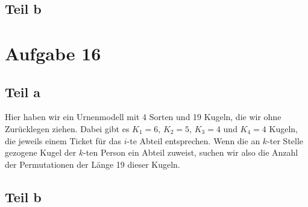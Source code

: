 \documentclass[10pt,a4paper]{article}
\begin{document}
\subsection{Teil b}

\section{Aufgabe 16}

\subsection{Teil a}
Hier haben wir ein Urnenmodell mit 4 Sorten und 19 Kugeln, die wir ohne Zurücklegen ziehen.
Dabei gibt es $K_{1} = 6$, $K_{2} = 5$, $K_{3} = 4$ und $K_{4} = 4$ Kugeln, die jeweils einem Ticket für das $i$-te Abteil entsprechen.
Wenn die an $k$-ter Stelle gezogene Kugel der $k$-ten Person ein Abteil zuweist, suchen wir also die Anzahl der Permutationen der Länge 19 dieser Kugeln.


\subsection{Teil b}
\end{document}

